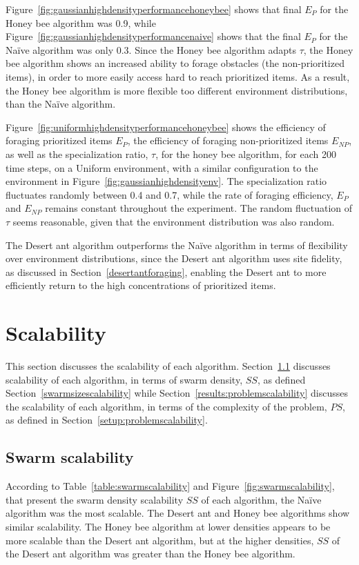 Figure~\ref{fig:gaussianhighdensityperformancehoneybee} shows that final $E_P$ for the Honey bee algorithm was 0.9, while Figure~\ref{fig:gaussianhighdensityperformancenaive} shows that the final $E_P$ for the Na\"ive algorithm was only 0.3. Since the Honey bee algorithm adapts $\tau$, the Honey bee algorithm shows an increased ability to forage obstacles (the non-prioritized items), in order to more easily access hard to reach prioritized items. As a result, the Honey bee algorithm is more flexible too different environment distributions, than the Na\"ive algorithm.

Figure~\ref{fig:uniformhighdensityperformancehoneybee} shows the efficiency of foraging prioritized items $E_P$, the efficiency of foraging non-prioritized items $E_{NP}$, as well as the specialization ratio, $\tau$, for the honey bee algorithm, for each 200 time steps, on a Uniform environment, with a similar configuration to the environment in Figure~\ref{fig:gaussianhighdensityenv}. The specialization ratio fluctuates randomly between 0.4 and 0.7, while the rate of foraging efficiency, $E_P$ and $E_{NP}$ remains constant throughout the experiment. The random fluctuation of $\tau$ seems reasonable, given that the environment distribution was also random.

The Desert ant algorithm outperforms the Na\"ive algorithm in terms of flexibility over environment distributions, since the Desert ant algorithm uses site fidelity, as discussed in Section~\ref{desertantforaging}, enabling the Desert ant to more efficiently return to the high concentrations of prioritized items.

\section{Scalability}
\label{results:scalability}

This section discusses the scalability of each algorithm. Section~\ref{results:swarmscalability} discusses scalability of each algorithm, in terms of swarm density, $SS$, as defined Section~\ref{swarmsizescalability} while Section~\ref{results:problemscalability} discusses the scalability of each algorithm, in terms of the complexity of the problem, $PS$, as defined in Section~\ref{setup:problemscalability}.

\subsection{Swarm scalability}
\label{results:swarmscalability}
According to Table~\ref{table:swarmscalability} and Figure~\ref{fig:swarmscalability}, that present the swarm density scalability $SS$ of each algorithm, the Na\"ive algorithm was the most scalable. The Desert ant and Honey bee algorithms show similar scalability. The Honey bee algorithm at lower densities appears to be more scalable than the Desert ant algorithm, but at the higher densities, $SS$ of the Desert ant algorithm was greater than the Honey bee algorithm. %

